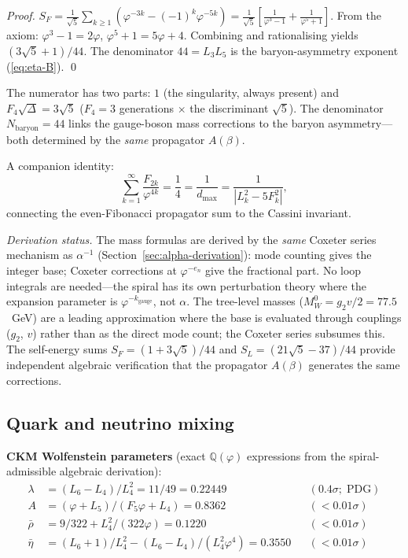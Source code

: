 \documentclass[12pt,a4paper]{article}
\begin{document}
\begin{proof}
$S_F = \frac{1}{\sqrt{5}}\sum_{k\geq 1}(\varphi^{-3k} - (-1)^k\varphi^{-5k}) = \frac{1}{\sqrt{5}}\!\left[\frac{1}{\varphi^3-1} + \frac{1}{\varphi^5+1}\right]$.  From the axiom: $\varphi^3 - 1 = 2\varphi$, $\varphi^5 + 1 = 5\varphi + 4$.  Combining and rationalising yields $(3\sqrt{5}+1)/44$.  The denominator $44 = L_3 L_5$ is the baryon-asymmetry exponent (\ref{eq:eta-B}).  \qed
\end{proof}

\noindent The numerator has two parts: $1$ (the singularity, always present) and $F_4\sqrt{\Delta} = 3\sqrt{5}$ ($F_4 = 3$ generations $\times$ the discriminant $\sqrt{5}$).  The denominator $N_{\mathrm{baryon}} = 44$ links the gauge-boson mass corrections to the baryon asymmetry---both determined by the \emph{same} propagator $A(\beta)$.

A companion identity:
\begin{equation}
\sum_{k=1}^{\infty} \frac{F_{2k}}{\varphi^{4k}} = \frac{1}{4} = \frac{1}{d_{\max}} = \frac{1}{|L_k^2 - 5F_k^2|},
\end{equation}
connecting the even-Fibonacci propagator sum to the Cassini invariant.

\noindent\textit{Derivation status.}  The mass formulas are derived by the \emph{same} Coxeter series mechanism as $\alpha^{-1}$ (Section~\ref{sec:alpha-derivation}): mode counting gives the integer base; Coxeter corrections at $\varphi^{-e_n}$ give the fractional part.  No loop integrals are needed---the spiral has its own perturbation theory where the expansion parameter is $\varphi^{-k_{\mathrm{gauge}}}$, not $\alpha$.  The tree-level masses ($M_W^0 = g_2 v/2 = 77.5$~GeV) are a leading approximation where the base is evaluated through couplings ($g_2$, $v$) rather than as the direct mode count; the Coxeter series subsumes this.  The self-energy sums $S_F = (1{+}3\sqrt{5})/44$ and $S_L = (21\sqrt{5}{-}37)/44$ provide independent algebraic verification that the propagator $A(\beta)$ generates the same corrections.

\subsection{Quark and neutrino mixing}

\textbf{CKM Wolfenstein parameters} (exact $\mathbb{Q}(\varphi)$ expressions from the spiral-admissible algebraic derivation):
\begin{align}
\lambda &= (L_6-L_4)/L_4^2 = 11/49 = 0.22449 && (0.4\sigma;\; \text{PDG}) \\
A &= (\varphi + L_5)/(F_5\varphi + L_4) = 0.8362 && ({<}0.01\sigma) \\
\bar{\rho} &= 9/322 + L_4^2/(322\varphi) = 0.1220 && ({<}0.01\sigma) \\
\bar{\eta} &= (L_6{+}1)/L_4^2 - (L_6{-}L_4)/(L_4^2\varphi^4) = 0.3550 && ({<}0.01\sigma)
\end{align}
\end{document}
